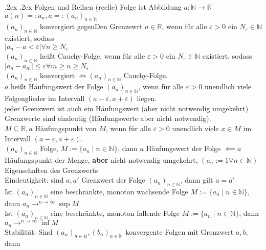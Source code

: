 \documentclass[9pt, landscape,a4paper]{extarticle}
\makeatletter
\renewcommand{\section}{\@startsection{section}{1}{0mm}%
                                {.2ex}%
                                {.2ex}%
                                {\sffamily\small\bfseries}}
\newcommand*\abs[1]{\lvert#1\rvert}
\newcommand\eps{\varepsilon}
\makeatother
\begin{document}
\begin{multicols*}{4}
  \section{Folgen und Reihen}
  (reelle) Folge ist Abbildung $a: \mathbb{N}\to \mathbb{R}$ \\
  $a(n) =: a_n, a =: (a_n)_{n\in\mathbb{N}}$ \\
  $(a_n)_{n\in\mathbb{N}}$ konvergiert gegenDen Grenzewrt $a\in \mathbb{R}$, wenn für alle $\eps > 0$ ein $N_\eps \in \mathbb{N}$ existiert, sodass \\
  $\abs{a_n - a < \eps} \forall n\geq N_\eps$ \\
  $(a_n)_{n\in\mathbb{N}}$ heißt Cauchy-Folge, wenn für alle $\eps > 0$ ein $N_\eps \in\mathbb{N}$ existiert, sodass \\
  $\abs{a_n - a_m} \leq \eps \forall m\geq n \geq N_\eps$ \\
  $(a_n)_{n\in\mathbb{N}}$ konvergiert $\iff (a_n)_{n\in\mathbb{N}}$ Cauchy-Folge. \\
  $a$ heißt Häufungswert der Folge $(a_n)_{n\in\mathbb{N}}$, wenn für alle $\eps > 0$ unendlich viele Folgenglieder im Intervall $(a - \eps, a + \eps)$ liegen. \\
  jeder Grenzwert ist auch ein Häufungswert (aber nicht notwendig umgekehrt) \\
  Grenzwerte sind eindeutig (Häufungswerte aber nicht notwendig). \\
  $M\subseteq \mathbb{R}, a$ Häufungspunkt von $M$, wenn für alle $\eps > 0$ unendlich viele $x\in M$ im Intervall $(a - \eps, a + \eps)$. \\
  $(a_n)_{n\in\mathbb{N}}$ Folge, $M := \{a_n \mid n\in\mathbb{N}\}$, dann $a$ Häufungswert der Folge $\impliedby a$ Häufungspunkt der Menge, \textbf{aber} nicht
  notwendig umgekehrt, $(a_n := 1 \forall n\in\mathbb{N})$ \\
  Eigenschaften des Grenzwerts \\
  Eindeutigkeit: sind $a, a'$ Grenzwert der Folge $(a_n)_{n\in\mathbb{N}}$, dann gilt $a = a'$ \\
  Ist $(a_n)_{n\in\mathbb{N}}$ eine beschränkte, monoton wachsende Folge $M:= \{a_n \mid n\in\mathbb{N}\}$, dann $a_n \to^{n\rightarrow \infty} \sup M$ \\
  Ist $(a_n)_{n\in\mathbb{N}}$ eine beschränkte, monoton fallende Folge $M:= \{a_n \mid n\in\mathbb{N}\}$, dann $a_n \to^{n\rightarrow \infty} \inf M$ \\
  Stabilität: Sind $(a_n)_{n\in\mathbb{N}}, (b_n)_{n\in\mathbb{N}}$ konvergente Folgen mit Grenzwert $a, b$, dann \\

\end{multicols*}
\end{document}
